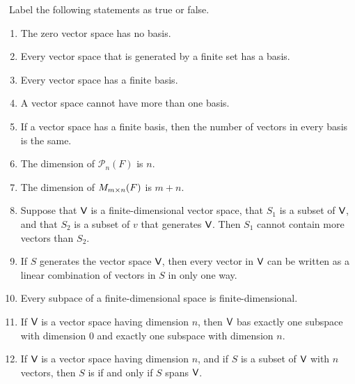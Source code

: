 \exercisesection

\begin{exercise} \label{exercise 1.6.1}\ 
Label the following statements as true or false.
\begin{enumerate}
\item The zero vector space has no basis.
\item Every vector space that is generated by a finite set has a basis.
\item Every vector space has a finite basis.
\item A vector space cannot have more than one basis.
\item If a vector space has a finite basis, then the number of vectors in every basis is the same.
\item The dimension of \(\mathcal{P}_n(F)\) is \(n\).
\item The dimension of \(M_{m \times n}(F)\) is \(m + n\).
\item Suppose that \(\textsf{V}\) is a finite-dimensional vector space, that \(S_1\) is a \LID{} subset of \(\textsf{V}\), and that \(S_2\) is a subset of \(v\) that
generates \(\textsf{V}\).
    Then \(S_1\) cannot contain more vectors than \(S_2\).
\item If \(S\) generates the vector space \(\textsf{V}\), then every vector in \(\textsf{V}\) can be written as a linear combination of vectors in \(S\) in only one way. 
\item Every subpace of a finite-dimensional space is finite-dimensional.
\item If \(\textsf{V}\) is a vector space having dimension \(n\), then \(\textsf{V}\) bas exactly one subspace with dimension \(0\) and exactly one subspace with dimension \(n\).
\item If \(\textsf{V}\) is a vector space having dimension \(n\), and if \(S\) is a subset of \(\textsf{V}\) with \(n\) vectors, then \(S\) is \LID{} if and only if \(S\)
spans \(\textsf{V}\).
\end{enumerate}
\end{exercise}

